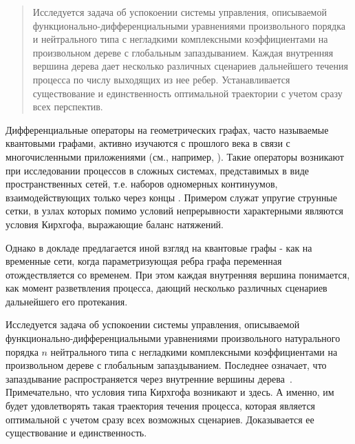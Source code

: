 \maketitle

\begin{abstract}
Исследуется задача об успокоении системы управления, описываемой функ\-цио\-наль\-но-диф\-ференциальными уравнениями произвольного порядка и
нейтрального типа с негладкими комплексными коэффициентами на произвольном дереве с глобальным запаздыванием. Каждая внутренняя вершина
дерева дает несколько различных сценариев дальнейшего течения процесса по числу выходящих из нее ребер. Устанавливается существование и
единственность оптимальной траектории с учетом сразу всех перспектив.

\end{abstract}


Дифференциальные операторы на геометрических графах, часто называемые квантовыми графами, активно изучаются с прошлого века в связи с
многочисленными приложениями (см., например, \cite{Pokornyi, Berkolaiko, Buterin-23}). Такие операторы возникают при исследовании процессов в
сложных системах, представимых в виде пространственных сетей, т.е. наборов одномерных континуумов, взаимодействующих только через концы
\cite{Pokornyi}. Примером служат упругие струнные сетки, в узлах которых помимо условий непрерывности характерными являются условия Кирхгофа,
выражающие баланс натяжений.

Однако в докладе предлагается иной взгляд на квантовые графы - как на временные сети, когда параметризующая ребра графа переменная
отождествляется со временем. При этом каждая внутренняя вершина понимается, как момент разветвления процесса, дающий несколько различных
сценариев дальнейшего его протекания.

Исследуется задача об успокоении системы управления, описываемой функционально-дифференциальными уравнениями произвольного натурального
порядка $n$ нейтрального типа с негладкими комплексными коэффициентами на произвольном дереве с глобальным запаздыванием. Последнее означает,
что запаздывание распространяется через внутренние вершины дерева~\cite{Buterin-23}. Примечательно, что условия типа Кирхгофа возникают и
здесь. А именно, им будет удовлетворять такая траектория течения процесса, которая является оптимальной с учетом сразу всех возможных
сценариев. Доказывается ее существование и единственность.


